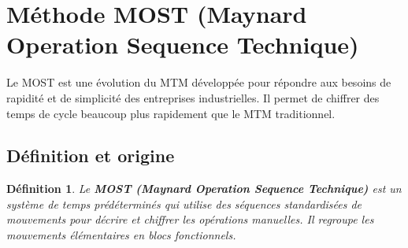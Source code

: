 \documentclass[a4paper,12pt]{article}
\newtheorem{definition}{Définition}[section]
\begin{document}
\begin{center}
\end{center}


\section{Méthode MOST (Maynard Operation Sequence Technique)}

Le MOST est une évolution du MTM développée pour répondre aux besoins de rapidité et de simplicité des entreprises industrielles. Il permet de chiffrer des temps de cycle beaucoup plus rapidement que le MTM traditionnel.

\subsection{Définition et origine}

\begin{definition}
Le \textbf{MOST (Maynard Operation Sequence Technique)} est un système de temps prédéterminés qui utilise des séquences standardisées de mouvements pour décrire et chiffrer les opérations manuelles. Il regroupe les mouvements élémentaires en blocs fonctionnels.
\end{definition}
\end{document}

